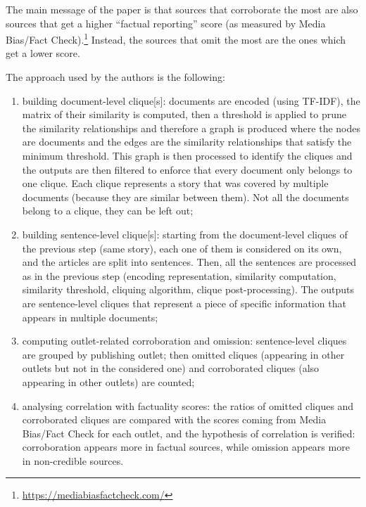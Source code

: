 The main message of the paper is that sources that \gls{corroborate} the most are also sources that get a higher ``factual reporting'' score (as measured by Media Bias/Fact Check).\footnote{\url{https://mediabiasfactcheck.com/}}
Instead, the sources that \gls{omit} the most are the ones which get a lower score.

The approach used by the authors is the following:
\begin{enumerate}
    \item building document-level \gls{clique}[s]: documents are encoded (using TF-IDF), the matrix of their similarity is computed, then a threshold is applied to prune the similarity relationships and therefore a graph is produced where the nodes are documents and the edges are the similarity relationships that satisfy the minimum threshold. This graph is then processed to identify the cliques and the outputs are then filtered to enforce that every document only belongs to one clique. Each clique represents a story that was covered by multiple documents (because they are similar between them). Not all the documents belong to a clique, they can be left out;
    \item building sentence-level \gls{clique}[s]: starting from the document-level cliques of the previous step (same story), each one of them is considered on its own, and the articles are split into sentences. Then, all the sentences are processed as in the previous step (encoding representation, similarity computation, similarity threshold, cliquing algorithm, clique post-processing). The outputs are sentence-level cliques that represent a piece of specific information that appears in multiple documents; 
    \item computing outlet-related corroboration and omission: sentence-level cliques are grouped by publishing outlet; then omitted cliques (appearing in other outlets but not in the considered one) and corroborated cliques (also appearing in other outlets) are counted;
    \item analysing correlation with factuality scores: the ratios of omitted cliques and corroborated cliques are compared with the scores coming from Media Bias/Fact Check for each outlet, and the hypothesis of correlation is verified: corroboration appears more in factual sources, while omission appears more in non-credible sources.
\end{enumerate}

